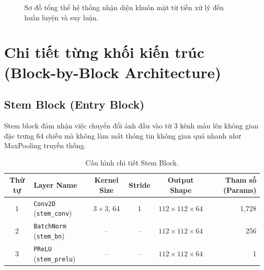 \documentclass[11pt,a4paper]{article}
\begin{document}
\begin{figure}[H]
\caption{Sơ đồ tổng thể hệ thống nhận diện khuôn mặt từ tiền xử lý đến huấn luyện và suy luận.}
\end{figure}

\section{Chi tiết từng khối kiến trúc (Block-by-Block Architecture)}

\subsection{Stem Block (Entry Block)}
Stem block đảm nhận việc chuyển đổi ảnh đầu vào từ 3 kênh màu lên không gian đặc trưng 64 chiều mà không làm mất thông tin không gian quá nhanh như MaxPooling truyền thống.

\begin{table}[H]
\centering
\begin{tabular}{c l c c c r}
\toprule
\textbf{Thứ tự} & \textbf{Layer Name} & \textbf{Kernel Size} & \textbf{Stride} & \textbf{Output Shape} & \textbf{Tham số (Params)} \\
\midrule
1 & \texttt{Conv2D} (\texttt{stem\_conv}) & $3 \times 3$, 64 & 1 & $112 \times 112 \times 64$ & 1,728 \\
2 & \texttt{BatchNorm} (\texttt{stem\_bn}) & -- & -- & $112 \times 112 \times 64$ & 256 \\
3 & \texttt{PReLU} (\texttt{stem\_prelu}) & -- & -- & $112 \times 112 \times 64$ & 1 \\
\bottomrule
\end{tabular}
\caption{Cấu hình chi tiết Stem Block.}
\end{table}
\end{document}
